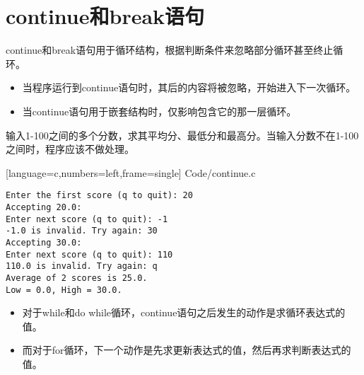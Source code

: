 \section{continue和break语句}
\begin{frame}[fragile]\ft{\secname}
continue和break语句用于循环结构，根据判断条件来忽略部分循环甚至终止循环。
\end{frame}


\begin{frame}[fragile]
\begin{itemize}
\item
当程序运行到continue语句时，其后的内容将被忽略，开始进入下一次循环。\\[0.1in]
\item
当continue语句用于嵌套结构时，仅影响包含它的那一层循环。
\end{itemize}
\end{frame}


\begin{frame}[fragile]
\begin{li}
输入1-100之间的多个分数，求其平均分、最低分和最高分。当输入分数不在1-100之间时，程序应该不做处理。
\end{li}

\end{frame}


\begin{frame}

[language=c,numbers=left,frame=single]
{Code/continue.c}
\end{frame}

\begin{frame}[fragile]
\begin{lstlisting}[backgroundcolor=\color{red!10}]
Enter the first score (q to quit): 20
Accepting 20.0:
Enter next score (q to quit): -1
-1.0 is invalid. Try again: 30
Accepting 30.0:
Enter next score (q to quit): 110
110.0 is invalid. Try again: q
Average of 2 scores is 25.0.
Low = 0.0, High = 30.0.
\end{lstlisting}

\end{frame}

\begin{frame}[fragile]
\begin{itemize}
\item 对于while和do while循环，continue语句之后发生的动作是求循环表达式的值。\\[0.1in]
\item 而对于for循环，下一个动作是先求更新表达式的值，然后再求判断表达式的值。
\end{itemize}

\end{frame}

